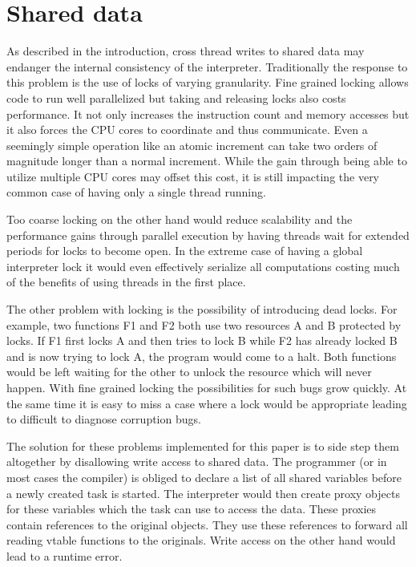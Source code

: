 \documentclass[bachelor,english]{hgbthesis}
\begin{document}
\section{Shared data}

As described in the introduction, cross thread writes to shared data may endanger the internal consistency of the interpreter. Traditionally the response to this problem is the use of locks of varying granularity. Fine grained locking allows code to run well parallelized but taking and releasing locks also costs performance. It not only increases the instruction count and memory accesses but it also forces the CPU cores to coordinate and thus communicate. Even a seemingly simple operation like an atomic increment can take two orders of magnitude longer than a normal increment\cite{LockingInOSKernels}. While the gain through being able to utilize multiple CPU cores may offset this cost, it is still impacting the very common case of having only a single thread running.

Too coarse locking on the other hand would reduce scalability and the performance gains through parallel execution by having threads wait for extended periods for locks to become open. In the extreme case of having a global interpreter lock it would even effectively serialize all computations costing much of the benefits of using threads in the first place.

The other problem with locking is the possibility of introducing dead locks. For example, two functions F1 and F2 both use two resources A and B protected by locks. If F1 first locks A and then tries to lock B while F2 has already locked B and is now trying to lock A, the program would come to a halt. Both functions would be left waiting for the other to unlock the resource which will never happen. With fine grained locking the possibilities for such bugs grow quickly. At the same time it is easy to miss a case where a lock would be appropriate leading to difficult to diagnose corruption bugs.

The solution for these problems implemented for this paper is to side step them altogether by disallowing write access to shared data. The programmer (or in most cases the compiler) is obliged to declare a list of all shared variables before a newly created task is started. The interpreter would then create proxy objects for these variables which the task can use to access the data. These proxies contain references to the original objects. They use these references to forward all reading vtable functions to the originals. Write access on the other hand would lead to a runtime error.
\end{document}
